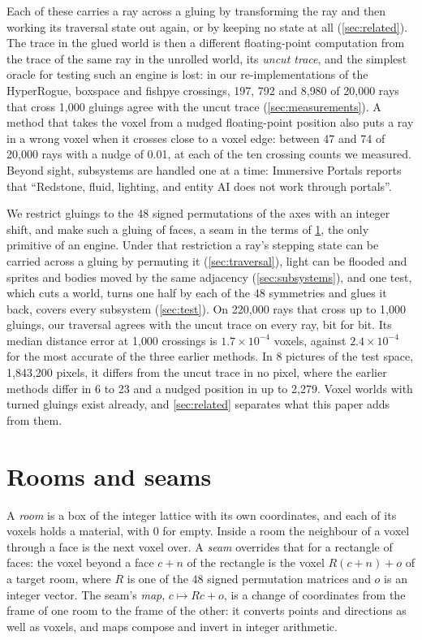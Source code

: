 \documentclass[10pt,a4paper]{article}
\begin{document}
Each of these carries a ray across a gluing by transforming the ray and then working its
traversal state out again, or by keeping no state at all (\cref{sec:related}). The trace in the
glued world is then a different floating-point computation from the trace of the same ray in the
unrolled world, its \emph{uncut trace}, and the simplest oracle for testing such an engine is lost: in our
re-implementations of the HyperRogue, boxspace and fishpye crossings, 197, 792 and 8{,}980 of
20{,}000 rays that cross 1{,}000 gluings agree with the uncut trace (\cref{sec:measurements}). A method that takes
the voxel from a nudged floating-point position also puts a ray in a wrong voxel when it crosses
close to a voxel edge: between 47 and 74 of 20{,}000 rays with a nudge of 0.01, at each of the
ten crossing counts we measured. Beyond sight, subsystems are handled one at a time: Immersive Portals reports that
``Redstone, fluid, lighting, and entity AI does not work through portals''.

We restrict gluings to the 48 signed permutations of the axes with an integer shift, and make
such a gluing of faces, a seam in the terms of \cref{sec:model}, the only primitive of an
engine. Under that restriction a ray's stepping
state can be carried across a gluing by permuting it (\cref{sec:traversal}), light can be
flooded and sprites and bodies moved by the same adjacency (\cref{sec:subsystems}), and one
test, which cuts a world, turns one half by each of the 48 symmetries and glues it back, covers
every subsystem (\cref{sec:test}). On 220{,}000 rays that cross up to 1{,}000 gluings, our
traversal agrees with the uncut trace on every ray, bit for bit. Its median distance error at
1{,}000 crossings is $1.7\times10^{-4}$ voxels, against $2.4\times10^{-4}$ for the most accurate
of the three earlier methods. In 8 pictures of the test space, 1{,}843{,}200 pixels, it differs
from the uncut trace in no pixel, where the earlier methods differ in 6 to 23 and a nudged
position in up to 2{,}279. Voxel worlds with turned gluings exist already, and
\cref{sec:related} separates what this paper adds from them.

\section{Rooms and seams}
\label{sec:model}

A \emph{room} is a box of the integer lattice with its own coordinates, and each of its voxels
holds a material, with 0 for empty. Inside a room the neighbour of a voxel through a face is the
next voxel over. A \emph{seam} overrides that for a rectangle of faces: the voxel beyond a face
$c + n$ of the rectangle is the voxel $R(c + n) + o$ of a target room, where $R$ is one of the 48
signed permutation matrices and $o$ is an integer vector. The seam's \emph{map},
$c \mapsto Rc + o$, is a change of coordinates from the frame of one room to the frame of the
other: it converts points and directions as well as voxels, and maps compose and invert in
integer arithmetic.
\end{document}
